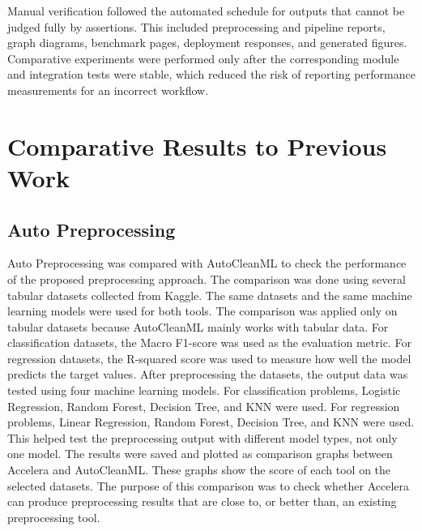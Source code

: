 \documentclass[12pt,a4paper]{report}
\begin{document}
\noindent Manual verification followed the automated schedule for outputs that
cannot be judged fully by assertions. This included preprocessing and pipeline
reports, graph diagrams, benchmark pages, deployment responses, and generated
figures. Comparative experiments were performed only after the corresponding
module and integration tests were stable, which reduced the risk of reporting
performance measurements for an incorrect workflow.

\section{Comparative Results to Previous Work}

\subsection{Auto Preprocessing}
Auto Preprocessing was compared with AutoCleanML to check the performance of the proposed preprocessing approach. The comparison was done using several tabular datasets collected from Kaggle. The same datasets and the same machine learning models were used for both tools.
The comparison was applied only on tabular datasets because AutoCleanML mainly works with tabular data. For classification datasets, the Macro F1-score was used as the evaluation metric. For regression datasets, the R-squared score was used to measure how well the model predicts the target values.
After preprocessing the datasets, the output data was tested using four machine learning models. For classification problems, Logistic Regression, Random Forest, Decision Tree, and KNN were used. For regression problems, Linear Regression, Random Forest, Decision Tree, and KNN were used. This helped test the preprocessing output with different model types, not only one model.
The results were saved and plotted as comparison graphs between Accelera and AutoCleanML. These graphs show the score of each tool on the selected datasets. The purpose of this comparison was to check whether Accelera can produce preprocessing results that are close to, or better than, an existing preprocessing tool.
\end{document}
